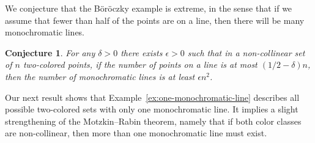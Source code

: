 \documentclass[a4paper,11pt,leqno]{article}
\newtheorem{conjecture}{Conjecture}
\begin{document}
We conjecture that the B\"or\"oczky example is extreme, in the sense that if we assume that fewer than half of the points are on a line, then there will be many monochromatic lines.
\begin{conjecture}
For any $\delta > 0$ there exists $\epsilon > 0$ such that in a non-collinear set of $n$ two-colored points, if the number of points on a line is at most $(1/2-\delta)n$, then the number of monochromatic lines is at least $\epsilon n^2$.  
\end{conjecture}

Our next result shows that Example~\ref{ex:one-monochromatic-line} describes all possible two-colored sets with only one monochromatic line.
It implies a slight strengthening of the Motzkin–Rabin theorem, namely that if both color classes are non-collinear, then more than one monochromatic line must exist.
\end{document}
